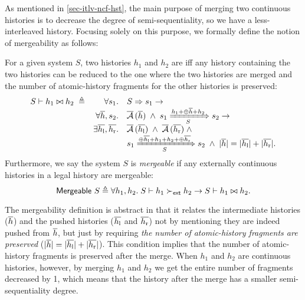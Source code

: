 As mentioned in \autoref{sec-itlv-ncf-hst}, the main purpose of merging two continuous histories is to decrease the degree of semi-sequentiality, so we have a less-interleaved history.
Focusing solely on this purpose, we formally define the notion of mergeability as follows:
\begin{definition}[Mergeability]
  \label{def-mgb}
  For a given system $S$, two histories $h_1$ and $h_2$ are  iff any history containing the two histories can be reduced to the one where the two histories are merged and the number of atomic-history fragments for the other histories is preserved:
  \begin{displaymath}
    \begin{array}{rrl}
      \hmgb{S}{h_1}{h_2}\; \triangleq & \forall s_1. & \semrch{S}{s_1} \to\\
      & \forall \listof{h}, s_2. & \atomicHsts{\listof{h}} \;\wedge\;
      \semsteps{S}{s_1}{\listapp{h_1}{\listapp{\listconcat{\listof{h}}}{h_2}}}{s_2} \to\\
      & \exists \listof{h_{\textrm{l}}}, \listof{h_{\textrm{r}}}.
      & \atomicHsts{\listof{h_{\textrm{l}}}} \;\wedge\; \atomicHsts{\listof{h_{\textrm{r}}}} \;\wedge\\
      & & \semsteps{S}{s_1}{\listapp{\listconcat{\listof{h_{\textrm{l}}}}}{\listapp{h_1}{\listapp{h_2}{\listconcat{\listof{h_{\textrm{r}}}}}}}}{s_2} \;\wedge\; \sizeof{\listof{h}} = \sizeof{\listof{h_{\textrm{l}}}} + \sizeof{\listof{h_{\textrm{r}}}}.
    \end{array}
  \end{displaymath}
  Furthermore, we say the system $S$ is \emph{mergeable} if any externally continuous histories in a legal history are mergeable:
  \begin{displaymath}
    \smgb{S} \triangleq \forall h_1, h_2.\; \hextcont{S}{h_1}{h_2} \to \hmgb{S}{h_1}{h_2}.
  \end{displaymath}
\end{definition}

The mergeability definition is abstract in that it relates the intermediate histories ($\listof{h}$) and the pushed histories ($\listof{h_{\textrm{l}}}$ and $\listof{h_{\textrm{r}}}$) not by mentioning they are indeed pushed from $\listof{h}$, but just by requiring \emph{the number of atomic-history fragments are preserved} ($\sizeof{\listof{h}} = \sizeof{\listof{h_{\textrm{l}}}} + \sizeof{\listof{h_{\textrm{r}}}}$).
This condition implies that the number of atomic-history fragments is preserved after the merge.
When $h_1$ and $h_2$ are continuous histories, however, by merging $h_1$ and $h_2$ we get the entire number of fragments decreased by 1, which means that the history after the merge has a smaller semi-sequentiality degree.

